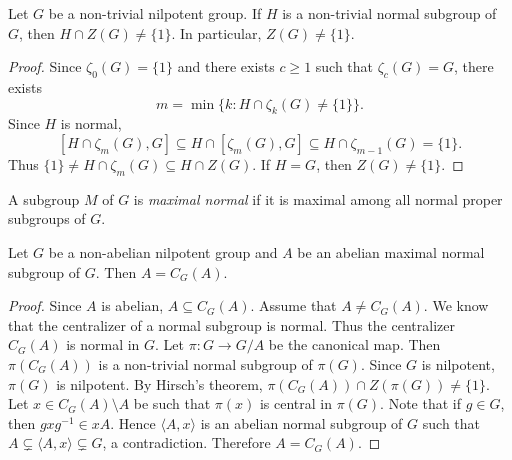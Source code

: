 \begin{theorem}[Hirsch]
	\label{thm:Z(nilpotent)}
	Let $G$ be a non-trivial nilpotent group. If $H$ is a non-trivial normal subgroup of $G$, then 
	$H\cap Z(G)\ne\{1\}$. In particular, $Z(G)\ne\{1\}$. 
\end{theorem}

\begin{proof}
	Since $\zeta_0(G)=\{1\}$ and there exists $c\geq 1$ such that $\zeta_c(G)=G$, there exists  
	\[
	m=\min\{k:H\cap\zeta_k(G)\ne\{1\}\}.
	\]
	Since $H$ is normal, 
	\[
	[H\cap\zeta_m(G),G]\subseteq H\cap[\zeta_m(G),G]\subseteq H\cap\zeta_{m-1}(G)=\{1\}.
	\]
	Thus $\{1\}\ne H\cap\zeta_m(G)\subseteq H\cap Z(G)$. If $H=G$, then $Z(G)\ne\{1\}$. 
\end{proof}



A subgroup $M$ of $G$ is {\em maximal normal} if it is maximal
among all normal proper subgroups of $G$.  

\begin{corollary}
	Let $G$ be a non-abelian nilpotent group and $A$ be an abelian 
	maximal normal subgroup of $G$. Then $A=C_G(A)$.
\end{corollary}

\begin{proof}
	Since $A$ is abelian, $A\subseteq C_G(A)$. Assume that $A\ne C_G(A)$.
	We know that the centralizer of a normal subgroup is normal. Thus the centralizer $C_G(A)$ is normal in $G$. 
	Let $\pi\colon G\to G/A$ be the canonical map.
	Then $\pi(C_G(A))$ is a non-trivial normal subgroup of $\pi(G)$. Since 
	$G$ is nilpotent, $\pi(G)$ is nilpotent. By Hirsch's theorem, 
	$\pi(C_G(A))\cap Z(\pi(G))\ne\{1\}$. Let
	$x\in C_G(A)\setminus A$ be such that $\pi(x)$ is central in $\pi(G)$. 
	Note that if $g\in G$, then $gxg^{-1}\in xA$. 
	Hence 
	$\langle A,x\rangle$ is an abelian normal subgroup of $G$ such that   
	$A\subsetneq \langle
	A,x\rangle\subsetneq G$, a contradiction. Therefore $A=C_G(A)$. 
\end{proof}

